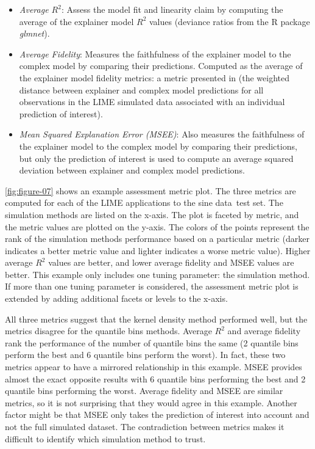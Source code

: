 \documentclass[AMS,STIX2COL]{WileyNJD-v2}\usepackage[]{graphicx}\usepackage[]{color}
\newcommand{\data}{sine data}
\begin{document}
\begin{itemize}
\item \emph{Average $R^2$}: Assess the model fit and linearity claim by computing the average of the explainer model $R^2$ values (deviance ratios from the R package \emph{glmnet}).

\item \emph{Average Fidelity}: Measures the faithfulness of the explainer model to the complex model by comparing their predictions. Computed as the average of the explainer model fidelity metrics: a metric presented in \citet{ribeiro:2016} (the weighted distance between explainer and complex model predictions for all observations in the LIME simulated data associated with an individual prediction of interest). 

\item \emph{Mean Squared Explanation Error (MSEE)}: Also measures the faithfulness of the explainer model to the complex model by comparing their predictions, but only the prediction of interest is used to compute an average squared deviation between explainer and complex model predictions.
\end{itemize}

\autoref{fig:figure-07} shows an example assessment metric plot. The three metrics are computed for each of the LIME applications to the \data \ test set. The simulation methods are listed on the x-axis. The plot is faceted by metric, and the metric values are plotted on the y-axis. The colors of the points represent the rank of the simulation methods performance based on a particular metric (darker indicates a better metric value and lighter indicates a worse metric value). Higher average $R^2$ values are better, and lower average fidelity and MSEE values are better. This example only includes one tuning parameter: the simulation method. If more than one tuning parameter is considered, the assessment metric plot is extended by adding additional facets or levels to the x-axis.

All three metrics suggest that the kernel density method performed well, but the metrics disagree for the quantile bins methods. Average $R^2$ and average fidelity rank the performance of the number of quantile bins the same (2 quantile bins perform the best and 6 quantile bins perform the worst). In fact, these two metrics appear to have a mirrored  relationship in this example. MSEE provides almost the exact opposite results with  6 quantile bins performing the best and 2 quantile bins performing the worst. Average fidelity and MSEE are similar metrics, so it is not surprising that they would agree in this example. Another factor might be that MSEE only takes the prediction of interest  into account and not the full simulated dataset. The contradiction between metrics makes it difficult to identify which simulation method to trust. 
\end{document}
